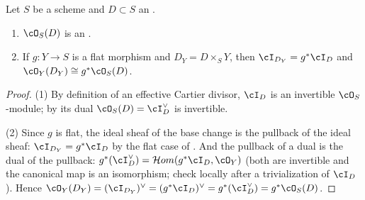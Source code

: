 \begin{lemma}[Properties of $\cO_X(D)$]\label{lem:pc-divisor-line-bundle-properties}
Let $S$ be a scheme and $D\subset S$ an
.
\begin{enumerate}
\item $\cO_S(D)$ is an
.
\item If $g:Y\to S$ is a flat morphism and $D_Y=D\times_SY$, then
$\cI_{D_Y}=g^*\cI_D$ and $\cO_Y(D_Y)\cong g^*\cO_S(D)$.
\end{enumerate}
\end{lemma}
\begin{proof}
(1) By definition of an effective Cartier divisor, $\cI_D$ is an
invertible $\cO_S$-module; by  its
dual $\cO_S(D)=\cI_D^\vee$ is invertible.

(2) Since $g$ is flat, the ideal sheaf of the base change is the
pullback of the ideal sheaf: $\cI_{D_Y}=g^*\cI_D$ by the flat case of
.  And the pullback of a dual is
the dual of the pullback:
$g^*(\cI_D^\vee)=\mathcal{H}om(g^*\cI_D,\cO_Y)$ (both are invertible
and the canonical map is an isomorphism; check locally after a
trivialization of $\cI_D$).  Hence
$\cO_Y(D_Y)=(\cI_{D_Y})^\vee=(g^*\cI_D)^\vee=g^*(\cI_D^\vee)=g^*\cO_S(D)$.
\end{proof}

